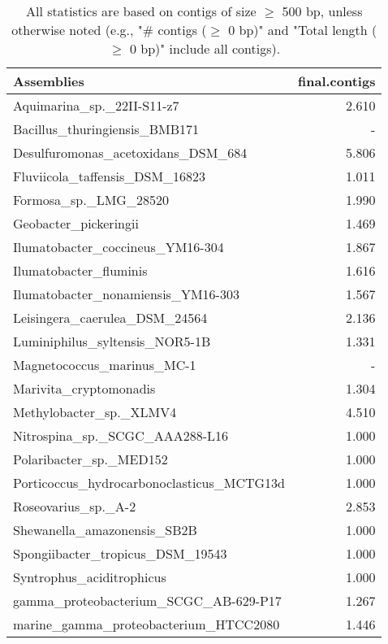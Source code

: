 \documentclass[12pt,a4paper]{article}
\begin{document}
\begin{table}[ht]
\begin{center}
\caption{All statistics are based on contigs of size $\geq$ 500 bp, unless otherwise noted (e.g., "\# contigs ($\geq$ 0 bp)" and "Total length ($\geq$ 0 bp)" include all contigs).}
\begin{tabular}{|l*{1}{|r}|}
\hline
Assemblies & final.contigs \\ \hline
Aquimarina\_sp.\_22II-S11-z7 & 2.610 \\ \hline
Bacillus\_thuringiensis\_BMB171 & - \\ \hline
Desulfuromonas\_acetoxidans\_DSM\_684 & 5.806 \\ \hline
Fluviicola\_taffensis\_DSM\_16823 & 1.011 \\ \hline
Formosa\_sp.\_LMG\_28520 & 1.990 \\ \hline
Geobacter\_pickeringii & 1.469 \\ \hline
Ilumatobacter\_coccineus\_YM16-304 & 1.867 \\ \hline
Ilumatobacter\_fluminis & 1.616 \\ \hline
Ilumatobacter\_nonamiensis\_YM16-303 & 1.567 \\ \hline
Leisingera\_caerulea\_DSM\_24564 & 2.136 \\ \hline
Luminiphilus\_syltensis\_NOR5-1B & 1.331 \\ \hline
Magnetococcus\_marinus\_MC-1 & - \\ \hline
Marivita\_cryptomonadis & 1.304 \\ \hline
Methylobacter\_sp.\_XLMV4 & 4.510 \\ \hline
Nitrospina\_sp.\_SCGC\_AAA288-L16 & 1.000 \\ \hline
Polaribacter\_sp.\_MED152 & 1.000 \\ \hline
Porticoccus\_hydrocarbonoclasticus\_MCTG13d & 1.000 \\ \hline
Roseovarius\_sp.\_A-2 & 2.853 \\ \hline
Shewanella\_amazonensis\_SB2B & 1.000 \\ \hline
Spongiibacter\_tropicus\_DSM\_19543 & 1.000 \\ \hline
Syntrophus\_aciditrophicus & 1.000 \\ \hline
gamma\_proteobacterium\_SCGC\_AB-629-P17 & 1.267 \\ \hline
marine\_gamma\_proteobacterium\_HTCC2080 & 1.446 \\ \hline
\end{tabular}
\end{center}
\end{table}
\end{document}
